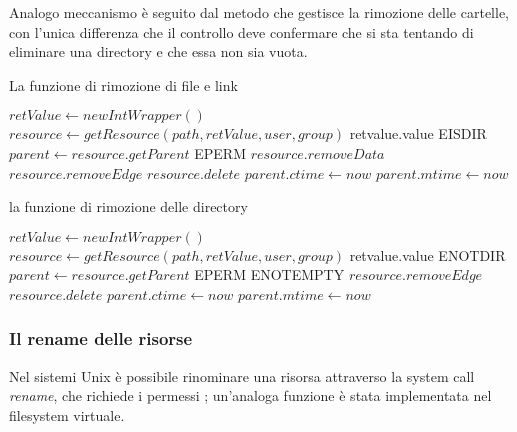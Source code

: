 Analogo meccanismo è seguito dal metodo che gestisce la rimozione delle cartelle, con l'unica differenza che il controllo deve confermare che si sta tentando di eliminare una directory e che essa non sia vuota.

\begin{algorithm}
\begin{algorithmic}[5]
\caption{La funzione di rimozione di file e link}
	\State $retValue \gets new IntWrapper()$
	\State $resource \gets getResource(path, retValue, user, group)$
		\State \Return retvalue.value
	\EndIf
		\State \Return EISDIR
	\EndIf
	\State $parent \gets resource.getParent$
		\State \Return EPERM
	\EndIf
		\State $resource.removeData$
	\EndIf
	\State $resource.removeEdge$
	\State $resource.delete$
	\State $parent.ctime \gets now$
	\State $parent.mtime \gets now$
	\State {}
\EndFunction
\end{algorithmic}
\end{algorithm}

\newpage

\begin{algorithm}
\begin{algorithmic}[5]
\caption{la funzione di rimozione delle directory}
	\State $retValue \gets new IntWrapper()$
	\State $resource \gets getResource(path, retValue, user, group)$
		\State \Return retvalue.value
	\EndIf
		\State \Return ENOTDIR
	\EndIf
	\State $parent \gets resource.getParent$
		\State \Return EPERM
	\EndIf
		\State \Return ENOTEMPTY
	\EndIf
	\State $resource.removeEdge$
	\State $resource.delete$
	\State $parent.ctime \gets now$
	\State $parent.mtime \gets now$
	\State {}
\EndFunction
\end{algorithmic}
\end{algorithm}

\subsubsection{Il rename delle risorse}
Nel sistemi Unix è possibile rinominare una risorsa attraverso la system call \emph{rename}, che richiede i permessi ; un'analoga funzione è stata implementata nel filesystem virtuale.

